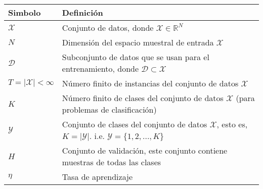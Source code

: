 \begin{table}[H]
    \begin{center}
        \begin{tabularx}{\textwidth}{|l|X|}
            \hline
            \textbf{Simbolo}                           & \textbf{Definición}                                                                                                                                                            \\
            \hline %
            $ \mathcal{X} $                            & Conjunto de datos, donde $\mathcal{X} \in \mathbb{R}^{N}$                                                                                                                      \\
            $ N $                                      & Dimensión del espacio muestral de entrada $\mathcal{X}$                                                                                                                        \\
            $ \mathcal{D} $                            & Subconjunto de datos que se usan para el entrenamiento, donde $\mathcal{D} \subset \mathcal{X}$                                                                                \\
            $ T = \lvert \mathcal{X} \rvert < \infty $ & Número finito de instancias del conjunto de datos $\mathcal{X}$                                                                                                                \\
            $ K $                                      & Número finito de clases del conjunto de datos $\mathcal{X}$ (para problemas de clasificación)                                                                                  \\
            $ \mathcal{Y} $                            & Conjunto de clases del conjunto de datos $\mathcal{X}$, esto es, $\textit{K} = \lvert \mathcal{Y} \rvert$. \newline i.e. ${\scriptstyle \mathcal{Y} = \{1,2,...,\textit{K}\}}$ \\
            $ H $                                      & Conjunto de validación, este conjunto contiene muestras de todas las clases                                                                                                    \\
            $ \eta $                                   & Tasa de aprendizaje                                                                                                                                                            \\

\end{tabularx}
\end{center}
\end{table}
